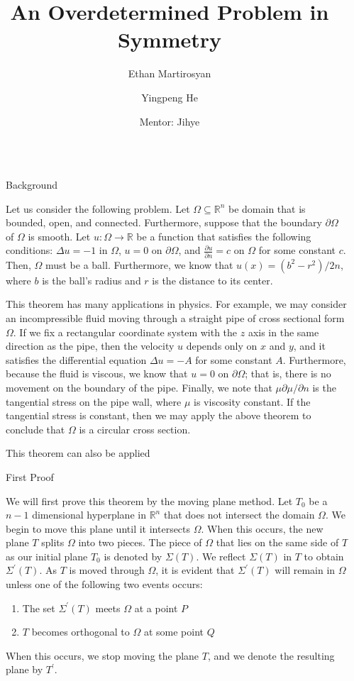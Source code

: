 \documentclass[final]{beamer}
\title{An Overdetermined Problem in Symmetry}
\author{Ethan Martirosyan \and Yingpeng He \and Mentor: Jihye}
\institute[shortinst]{University of California Santa Barbara}
\newlength{\sepwidth}
\newlength{\colwidth}
\newcommand{\separatorcolumn}{\begin{column}{\sepwidth}\end{column}}
\begin{document}
\begin{frame}[t]
\begin{columns}[t]
\separatorcolumn

\begin{column}{\colwidth}

  \begin{block}{Background}

    Let us consider the following problem. Let $\Omega \subseteq \mathbb{R}^n$ be domain that is bounded, open, and connected. Furthermore, suppose that the boundary $\partial{\Omega}$ of $\Omega$ is smooth. Let $u: \Omega \rightarrow \mathbb{R}$ be a function that satisfies the following conditions: $\Delta u = -1$ in $\Omega$, $u=0$ on $\partial{\Omega}$, and $\frac{\partial{u}}{\partial{n}} = c$ on $\Omega$ for some constant $c$. Then, $\Omega$ must be a ball. Furthermore, we know that $u(x) = (b^2-r^2)/2n$, where $b$ is the ball's radius and $r$ is the distance to its center.

  This theorem has many applications in physics. For example, we may consider an incompressible fluid moving through a straight pipe of cross sectional form $\Omega$. If we fix a rectangular coordinate system with the $z$ axis in the same direction as the pipe, then the velocity $u$ depends only on $x$ and $y$, and it satisfies the differential equation $\Delta u = -A$ for some constant $A$. Furthermore, because the fluid is viscous, we know that $u = 0$ on $\partial{\Omega}$; that is, there is no movement on the boundary of the pipe. Finally, we note that $\mu\partial{\mu}/\partial{n}$ is the tangential stress on the pipe wall, where $\mu$ is viscosity constant. If the tangential stress is constant, then we may apply the above theorem to conclude that $\Omega$ is a circular cross section.
 
 This theorem can also be applied 

  \end{block}

  \begin{block}{First Proof}

    We will first prove this theorem by the moving plane method. Let $T_0$ be a $n-1$ dimensional hyperplane in $\mathbb{R}^n$ that does not intersect the domain $\Omega$. We begin to move this plane until it intersects $\Omega$. When this occurs, the new plane $T$ splits $\Omega$ into two pieces. The piece of $\Omega$ that lies on the same side of $T$ as our initial plane $T_0$ is denoted by $\Sigma(T)$. We reflect $\Sigma(T)$ in $T$ to obtain $\Sigma^\prime(T)$. As $T$ is moved through $\Omega$, it is evident that $\Sigma^\prime(T)$ will remain in $\Omega$ unless one of the following two events occurs:
    \begin{enumerate}[]
        \item The set $\Sigma^\prime(T)$ meets $\Omega$ at a point $P$
        \item $T$ becomes orthogonal to $\Omega$ at some point $Q$
    \end{enumerate} When this occurs, we stop moving the plane $T$, and we denote the resulting plane by $T^\prime$.
    

\end{block}
\end{column}
\end{columns}
\end{frame}
\end{document}
